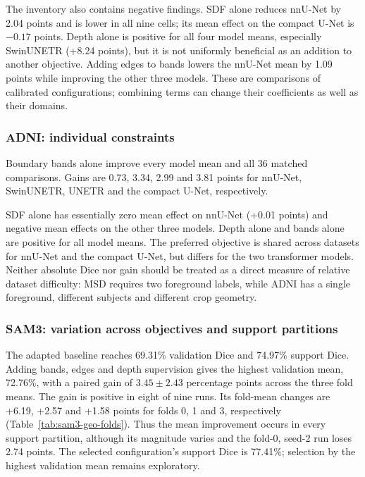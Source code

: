 \documentclass[12pt,a4paper]{article}
\begin{document}
The inventory also contains negative findings. SDF alone reduces
nnU-Net by 2.04 points and is lower in all nine cells; its mean effect
on the compact U-Net is $-0.17$ points. Depth alone is positive for
all four model means, especially SwinUNETR (+8.24 points), but it is
not uniformly beneficial as an addition to another objective. Adding
edges to bands lowers the nnU-Net mean by 1.09 points while improving
the other three models. These are comparisons of calibrated configurations;
combining terms can change their coefficients as well as their domains.

\subsubsection*{ADNI: individual constraints}

Boundary bands alone improve every model mean and all 36 matched
comparisons. Gains are 0.73, 3.34, 2.99 and 3.81 points for nnU-Net,
SwinUNETR, UNETR and the compact U-Net, respectively.


SDF alone has essentially zero mean effect on nnU-Net (+0.01 points)
and negative mean effects on the other three models. Depth alone and
bands alone are positive for all model means. The preferred objective
is shared across datasets for nnU-Net and the compact U-Net, but differs
for the two transformer models. Neither absolute Dice nor gain should
be treated as a direct measure of relative dataset difficulty: MSD
requires two foreground labels, while ADNI has a single foreground,
different subjects and different crop geometry.

\subsubsection*{SAM3: variation across objectives and support partitions}

The adapted baseline reaches 69.31\% validation Dice and 74.97\%
support Dice. Adding bands, edges and depth supervision gives the
highest validation mean, 72.76\%, with a paired gain of
$3.45\pm2.43$ percentage points across the three fold means.
The gain is positive in eight of nine runs. Its fold-mean changes are
+6.19, +2.57 and +1.58 points for folds 0, 1 and 3, respectively
(Table~\ref{tab:sam3-geo-folds}). Thus the mean improvement occurs
in every support partition, although its magnitude varies and the
fold-0, seed-2 run loses 2.74 points. The selected configuration's
support Dice is 77.41\%; selection by the highest validation mean
remains exploratory.
\end{document}
